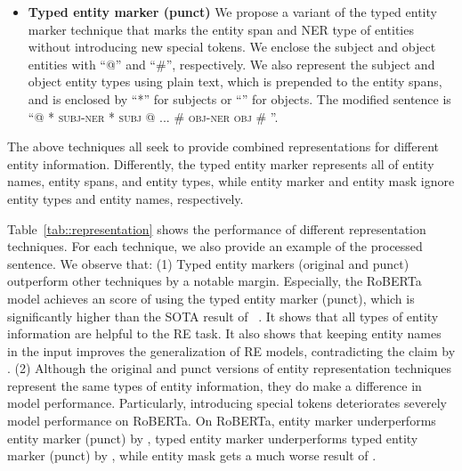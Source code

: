 \documentclass[11pt,a4paper]{article}
\begin{document}
\begin{itemize}[leftmargin=1em]
    \item \textbf{Typed entity marker (punct)} We propose a variant of the typed entity marker technique that marks the entity span and NER type of entities without introducing new special tokens.
    We enclose the subject and object entities with ``@'' and ``\#'', respectively.
    We also represent the subject and object entity types using plain text, which is prepended to the entity spans, and is enclosed by ``*'' for subjects or ``'' for objects.
    The modified sentence is ``@ * \textsc{subj-ner} * \textsc{subj} @ ... \#  \textsc{obj-ner}  \textsc{obj} \# ''.
\end{itemize}

The above techniques all seek to provide combined representations for different entity information.
Differently, the typed entity marker represents all of entity names, entity spans, and entity types, while entity marker and entity mask ignore entity types and entity names, respectively.

Table~\ref{tab::representation} shows the performance of different representation techniques.
For each technique, we also provide an example of the processed sentence.
We observe that: (1) Typed entity markers (original and punct) outperform other techniques by a notable margin.
Especially, the RoBERTa model achieves an  score of  using the typed entity marker (punct), which is significantly higher than the SOTA result of ~\cite{yamada-etal-2020-luke}.
It shows that all types of entity information are helpful to the RE task.
It also shows that keeping entity names in the input improves the generalization of RE models, contradicting the claim by \citet{zhang-etal-2017-position}.
(2) Although the original and punct versions of entity representation techniques represent the same types of entity information, they do make a difference in model performance.
Particularly, introducing special tokens deteriorates severely model performance on RoBERTa.
On RoBERTa, entity marker underperforms entity marker (punct) by , typed entity marker underperforms typed entity marker (punct) by , while entity mask gets a much worse result of .

\begin{table}[!t]
\centering
{}
    \caption{\textbf{Test  on the filtered test set of TACRED.}}
    \label{tab::filter}
\end{table}
\end{document}
